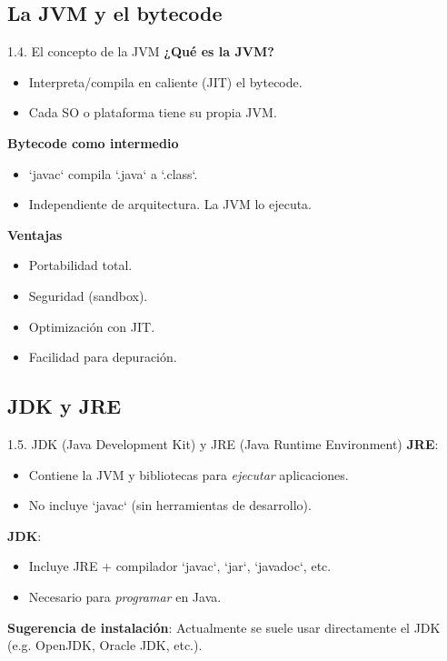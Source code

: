 \documentclass{beamer}
\begin{document}
\subsection{La JVM y el bytecode}

\begin{frame}{1.4. El concepto de la JVM}
\textbf{¿Qué es la JVM?}
\begin{itemize}
  \item Interpreta/compila en caliente (JIT) el bytecode.
  \item Cada SO o plataforma tiene su propia JVM.
\end{itemize}

\textbf{Bytecode como intermedio}
\begin{itemize}
  \item `javac` compila `.java` a `.class`.
  \item Independiente de arquitectura. La JVM lo ejecuta.
\end{itemize}

\textbf{Ventajas}
\begin{itemize}
  \item Portabilidad total.
  \item Seguridad (sandbox).
  \item Optimización con JIT.
  \item Facilidad para depuración.
\end{itemize}
\end{frame}

\subsection{JDK y JRE}

\begin{frame}{1.5. JDK (Java Development Kit) y JRE (Java Runtime Environment)}
\textbf{JRE}:
\begin{itemize}
  \item Contiene la JVM y bibliotecas para \textit{ejecutar} aplicaciones.
  \item No incluye `javac` (sin herramientas de desarrollo).
\end{itemize}

\textbf{JDK}:
\begin{itemize}
  \item Incluye JRE + compilador `javac`, `jar`, `javadoc`, etc.
  \item Necesario para \textit{programar} en Java.
\end{itemize}

\textbf{Sugerencia de instalación}:  
Actualmente se suele usar directamente el JDK (e.g. OpenJDK, Oracle JDK, etc.).
\end{frame}
\end{document}
